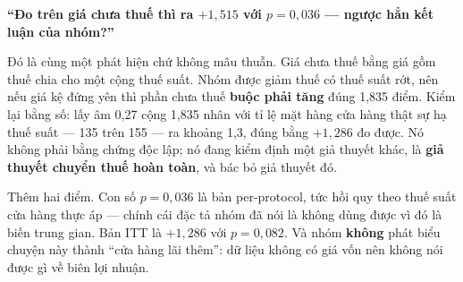 \documentclass[12pt]{article}
\newenvironment{noi}%
  {\vspace{3pt}\begin{list}{}{%
     \setlength{\leftmargin}{14pt}\setlength{\rightmargin}{0pt}%
     \setlength{\itemindent}{0pt}\setlength{\listparindent}{0pt}%
     \setlength{\parsep}{5pt}}\item[]%
   \color{black}}%
  {\end{list}\vspace{2pt}}
\begin{document}
\textbf{``Đo trên giá chưa thuế thì ra $+1{,}515$ với $p = 0{,}036$ --- ngược hẳn kết
luận của nhóm?''}
\begin{noi}
Đó là cùng một phát hiện chứ không mâu thuẫn. Giá chưa thuế bằng giá gồm thuế chia cho
một cộng thuế suất. Nhóm được giảm thuế có thuế suất rớt, nên nếu giá kệ đứng yên thì
phần chưa thuế \textbf{buộc phải tăng} đúng 1,835 điểm. Kiểm lại bằng số: lấy âm 0,27
cộng 1,835 nhân với tỉ lệ mặt hàng cửa hàng thật sự hạ thuế suất --- 135 trên 155 ---
ra khoảng 1,3, đúng bằng $+1{,}286$ đo được. Nó không phải bằng chứng độc lập; nó đang
kiểm định một giả thuyết khác, là \textbf{giả thuyết chuyển thuế hoàn toàn}, và bác bỏ
giả thuyết đó.

Thêm hai điểm. Con số $p = 0{,}036$ là bản per-protocol, tức hồi quy theo thuế suất
cửa hàng thực áp --- chính cái đặc tả nhóm đã nói là không dùng được vì đó là biến
trung gian. Bản ITT là $+1{,}286$ với $p = 0{,}082$. Và nhóm \textbf{không} phát biểu
chuyện này thành ``cửa hàng lãi thêm'': dữ liệu không có giá vốn nên không nói được gì
về biên lợi nhuận.
\end{noi}
\end{document}
